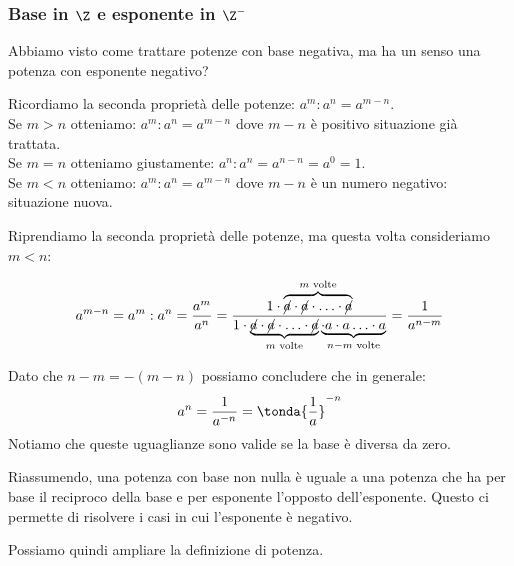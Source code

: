 % 

\subsubsection{Base in $\Z$ e esponente in $\Z^-$}

Abbiamo visto come trattare potenze con base negativa, ma ha un senso una 
potenza con esponente negativo?

Ricordiamo la seconda proprietà delle potenze: \(a^m : a^n = a^{m-n}\). \\
Se \(m > n\) otteniamo: \(a^m : a^n = a^{m-n}\) dove \(m-n\) è 
positivo situazione già trattata.\\
Se \(m = n\) otteniamo giustamente: \(a^n : a^n = a^{n-n} = a^0 = 1\).\\
Se \(m < n\) otteniamo: \(a^m : a^n = a^{m-n}\) dove \(m-n\) è 
un numero negativo: situazione nuova.

Riprendiamo la seconda proprietà delle potenze, ma questa volta 
consideriamo \(m < n\):

\[
 a^{m-n} = a^m: a^n = \frac{a^m}{a^n}=
 \frac{1 \cdot \overbrace{\cancel{a} \cdot \cancel{a} \cdot 
       \ldots \cdot \cancel{a}}^{m \text{ volte}}}
      {1 \cdot \underbrace{\cancel{a} \cdot \cancel{a} \cdot
                           \ldots \cdot \cancel{a}}_{m \text{ volte}} 
               \underbrace{\cdot a \cdot a \ldots 
                           \cdot a}_{n-m \text{ volte}}}=
 \frac{1}{a^{n-m}}
\]

Dato che \(n-m = -(m-n)\) possiamo concludere che in generale:
\[a^n = \frac{1}{a^{-n}} = \tonda{\frac{1}{a}}^{-n}\]
Notiamo che queste uguaglianze sono valide se la base è diversa da zero.

Riassumendo, una potenza con base non nulla è uguale a una potenza che ha 
per base il reciproco della base e per esponente l'opposto dell'esponente.
Questo ci permette di risolvere i casi in cui l'esponente è negativo.

Possiamo quindi ampliare la definizione di potenza.


